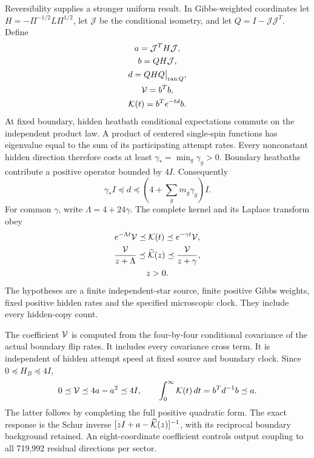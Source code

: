 Reversibility supplies a stronger uniform result. In Gibbs-weighted
coordinates let \(H=-\Pi^{-1/2}L\Pi^{1/2}\), let \(\mathcal J\) be the
conditional isometry, and let \(Q=I-\mathcal J\mathcal J^T\). Define
\[
\begin{gathered}
a=\mathcal J^TH\mathcal J,\\
b=QH\mathcal J,\\
d=QHQ\big|_{\operatorname{ran}Q},\\
{\cal V}=b^Tb,\\
{\cal K}(t)=b^Te^{-td}b.
\end{gathered}
\]
At fixed boundary, hidden heatbath conditional expectations commute on
the independent product law. A product of centered single-spin functions
has eigenvalue equal to the sum of its participating attempt rates.
Every nonconstant hidden direction therefore costs at least
\(\gamma_*=\min_g\gamma_g>0\). Boundary heatbaths contribute a positive
operator bounded by \(4I\). Consequently
\[
 \gamma_*I\preceq d\preceq
 \left(4+\sum_gm_g\gamma_g\right)I.
\]
For common \(\gamma\), write \(\Lambda=4+24\gamma\). The complete kernel
and its Laplace transform obey
\[
\begin{gathered}
e^{-\Lambda t}{\cal V}\preceq{\cal K}(t)
       \preceq e^{-\gamma t}{\cal V},\\
\frac{\cal V}{z+\Lambda}\preceq\widehat{\cal K}(z)
       \preceq\frac{\cal V}{z+\gamma},\\
z>0.
\end{gathered}
\]
The hypotheses are a finite independent-star source, finite positive
Gibbs weights, fixed positive hidden rates and the specified microscopic
clock. They include every hidden-copy count.

The coefficient \({\cal V}\) is computed from the four-by-four
conditional covariance of the actual boundary flip rates. It includes
every covariance cross term. It is independent of hidden attempt speed
at fixed source and boundary clock. Since
\(0\preceq H_B\preceq4I\),
\[
 0\preceq{\cal V}\preceq4a-a^2\preceq4I,\qquad
 \int_0^\infty{\cal K}(t)\,dt=b^Td^{-1}b\preceq a.
\]
The latter follows by completing the full positive quadratic form.
The exact response is the Schur inverse
\([zI+a-\widehat{\cal K}(z)]^{-1}\), with its reciprocal boundary
background retained. An eight-coordinate coefficient controls output
coupling to all 719,992 residual directions per sector.


